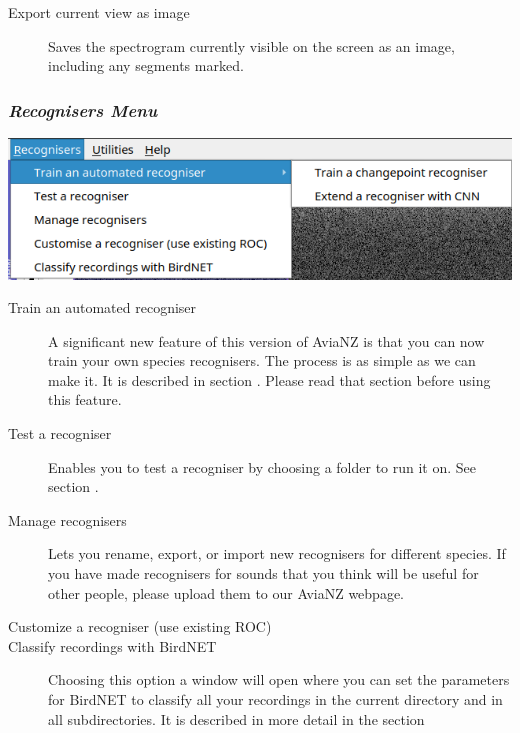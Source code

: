 \documentclass{scrartcl}
\begin{document}
\begin{description}
\item [Export current view as image] Saves the spectrogram currently visible on the screen as an image, including any segments marked. 
\end{description}

\subsubsection{\textit{Recognisers Menu}}

\begin{center}
\includegraphics[width=.7\textwidth]{Figures/RecognisersMenu}
\end{center}

\begin{description}
\item [Train an automated recogniser] A significant new feature of this version of AviaNZ is that you can now train your own species recognisers. The process is as simple as we can make it. It is described in section . Please read that section before using this feature.
\item [Test a recogniser] Enables you to test a recogniser by choosing a folder to run it on. See section .
\item[Manage recognisers] Lets you rename, export, or import new recognisers for different species. 
If you have made recognisers for sounds that you think will be useful for other people, please upload them to our AviaNZ webpage.   
\item[Customize a recogniser (use existing ROC)]
\item[Classify recordings with BirdNET] Choosing this option a window will open where you can set the parameters for BirdNET to classify all your recordings in the current directory and in all subdirectories. It is described in more detail in the section 
\end{description}
\end{document}
